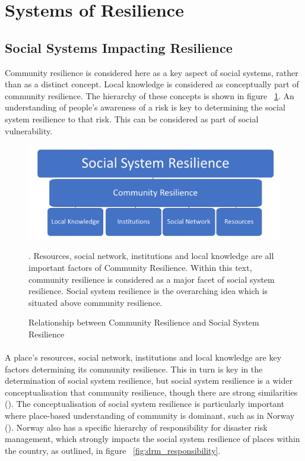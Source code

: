 \section{Systems of Resilience }

\subsection{Social Systems Impacting Resilience}
Community resilience is considered here as a key aspect of social systems, rather than as a distinct concept. Local knowledge is considered as conceptually part of community resilience. The hierarchy of these concepts is shown in figure ~\ref{fig:social_resilience}. An understanding of people's awareness of a risk is key to determining the social system resilience to that risk. This can be considered as part of social vulnerability.

\begin{figure}[h]
    \centering
    \includegraphics[width=1\textwidth]{fig_theory/new_social_system.png}
    \caption{Relationship between Community Resilience and Social System Resilience}{. Resources, social network, institutions and local knowledge are all important factors of Community Resilience. Within this text, community resilience is considered as a major facet of social system resilience. Social system resilience is the overarching idea which is situated above community resilience.}
    \label{fig:social_resilience}
\end{figure}
\paragraph{}

A place's resources, social network, institutions and local knowledge are key factors determining its community resilience. This in turn is key in the determination of social system resilience, but social system resilience is a wider conceptualisation that community resilience, though there are strong similarities (\cite{cutter_community_2020}). The conceptualisation of social system resilience is particularly important where place-based understanding of community is dominant, such as in Norway (\cite{rasanen_conceptualizing_2020}). Norway also has a specific hierarchy of responsibility for disaster risk management, which strongly impacts the social system resilience of places within the country, as outlined, in figure ~\ref{fig:drm_responsibility}.



